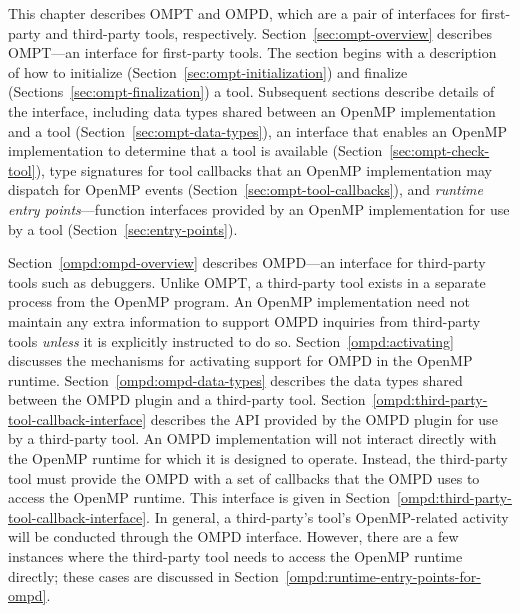 This chapter describes OMPT and OMPD, which are a pair of interfaces for first-party and third-party
tools, respectively.  Section~\ref{sec:ompt-overview} describes OMPT---an interface for first-party tools.
The section begins with a description of how to initialize (Section~\ref{sec:ompt-initialization})
and finalize (Sections~\ref{sec:ompt-finalization}) a tool.
Subsequent sections describe details of the interface, including
data types shared between an OpenMP implementation and a tool
(Section~\ref{sec:ompt-data-types}), 
an interface that enables an OpenMP implementation to determine that a
tool is available (Section~\ref{sec:ompt-check-tool}),
type signatures for tool callbacks 
that an OpenMP implementation may dispatch for OpenMP events
(Section~\ref{sec:ompt-tool-callbacks}), and 
\emph{runtime entry points}---function interfaces
provided by an OpenMP implementation for use by a tool
(Section~\ref{sec:entry-points}). 

Section~\ref{ompd:ompd-overview} describes
OMPD---an interface for  third-party tools such as debuggers. 
Unlike OMPT, a third-party tool exists in a separate process from 
the OpenMP program.
An OpenMP implementation need not maintain any extra information to support OMPD inquiries from third-party tools
\emph{unless} it is explicitly instructed to do so.
Section~\ref{ompd:activating} discusses the mechanisms for
activating support for OMPD in the OpenMP runtime.
Section~\ref{ompd:ompd-data-types}  describes the data types shared between the OMPD plugin and a third-party tool.
Section~\ref{ompd:third-party-tool-callback-interface} describes the API provided by the OMPD plugin for use by a third-party tool. 
An OMPD implementation will not interact directly with the OpenMP
runtime for which it is designed to operate.
Instead, the third-party tool must provide the OMPD with a set of
callbacks that the OMPD uses to access the OpenMP runtime.
This interface is given in
Section~\ref{ompd:third-party-tool-callback-interface}.
In general, a third-party's tool's OpenMP-related activity will be
conducted through the OMPD interface.
However, there are a few instances where the third-party tool needs
to access the OpenMP runtime directly;
these cases are discussed in
Section~\ref{ompd:runtime-entry-points-for-ompd}.









\newpage %

